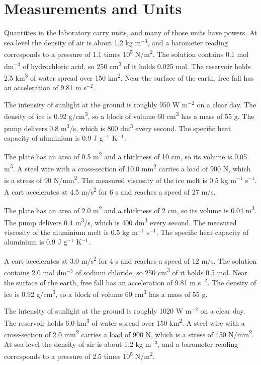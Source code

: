 \documentclass[11pt]{article}
\begin{document}
\section*{Measurements and Units}
Quantities in the laboratory carry units, and many of those units have powers.
At sea level the density of air is about 1.2 kg m$^{-3}$, and a barometer reading corresponds to a pressure of 1.1 times 10\textsuperscript{5} N/m\textsuperscript{2}. The solution contains 0.1 mol dm$^{-3}$ of hydrochloric acid, so 250 cm\textsuperscript{3} of it holds 0.025 mol. The reservoir holds 2.5 km\textsuperscript{3} of water spread over 150 km\textsuperscript{2}. Near the surface of the earth, free fall has an acceleration of 9.81 m s$^{-2}$.

The intensity of sunlight at the ground is roughly 950 W m$^{-2}$ on a clear day. The density of ice is 0.92 g/cm\textsuperscript{3}, so a block of volume 60 cm\textsuperscript{3} has a mass of 55 g. The pump delivers 0.8 m\textsuperscript{3}/s, which is 800 dm\textsuperscript{3} every second. The specific heat capacity of aluminium is 0.9 J g$^{-1}$ K$^{-1}$.

The plate has an area of 0.5 m\textsuperscript{2} and a thickness of 10 cm, so its volume is 0.05 m\textsuperscript{3}. A steel wire with a cross-section of 10.0 mm\textsuperscript{2} carries a load of 900 N, which is a stress of 90 N/mm\textsuperscript{2}. The measured viscosity of the ice melt is 0.5 kg m$^{-1}$ s$^{-1}$. A cart accelerates at 4.5 m/s\textsuperscript{2} for 6 s and reaches a speed of 27 m/s.

The plate has an area of 2.0 m\textsuperscript{2} and a thickness of 2 cm, so its volume is 0.04 m\textsuperscript{3}. The pump delivers 0.4 m\textsuperscript{3}/s, which is 400 dm\textsuperscript{3} every second. The measured viscosity of the aluminium melt is 0.5 kg m$^{-1}$ s$^{-1}$. The specific heat capacity of aluminium is 0.9 J g$^{-1}$ K$^{-1}$.

A cart accelerates at 3.0 m/s\textsuperscript{2} for 4 s and reaches a speed of 12 m/s. The solution contains 2.0 mol dm$^{-3}$ of sodium chloride, so 250 cm\textsuperscript{3} of it holds 0.5 mol. Near the surface of the earth, free fall has an acceleration of 9.81 m s$^{-2}$. The density of ice is 0.92 g/cm\textsuperscript{3}, so a block of volume 60 cm\textsuperscript{3} has a mass of 55 g.

The intensity of sunlight at the ground is roughly 1020 W m$^{-2}$ on a clear day. The reservoir holds 6.0 km\textsuperscript{3} of water spread over 150 km\textsuperscript{2}. A steel wire with a cross-section of 2.0 mm\textsuperscript{2} carries a load of 900 N, which is a stress of 450 N/mm\textsuperscript{2}. At sea level the density of air is about 1.2 kg m$^{-3}$, and a barometer reading corresponds to a pressure of 2.5 times 10\textsuperscript{5} N/m\textsuperscript{2}.
\end{document}
